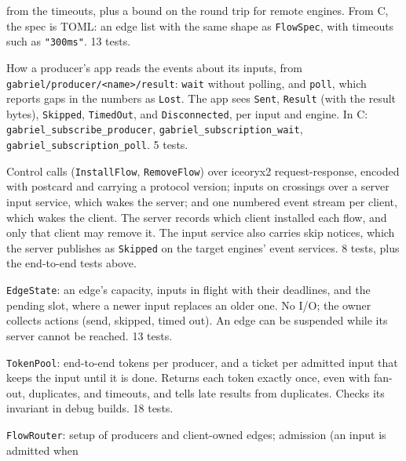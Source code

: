 \documentclass[11pt]{article}
\newcommand{\code}[1]{\texttt{#1}}
\begin{document}
\begin{description}[style=nextline, leftmargin=1.5em]
        from the timeouts, plus a bound on the round trip for remote engines.
        From C, the spec is TOML: an edge list with the same shape as
        \code{FlowSpec}, with timeouts such as \code{"300ms"}. 13 tests.
  \item[Subscription (\code{subscription.rs}, \code{ffi.rs})] How a
        producer's app reads the events about its inputs, from
        \nolinkurl{gabriel/producer/<name>/result}: \code{wait} without
        polling, and \code{poll}, which reports gaps in the numbers as
        \code{Lost}. The app sees \code{Sent}, \code{Result} (with the result
        bytes), \code{Skipped}, \code{TimedOut}, and \code{Disconnected}, per
        input and engine. In C: \code{gabriel\_subscribe\_producer},
        \code{gabriel\_subscription\_wait}, \code{gabriel\_subscription\_poll}.
        5 tests.
  \item[Local client transport (\code{client/local\_server.rs},
        \code{server/local\_clients.rs}, \code{wire.rs})] Control calls
        (\code{InstallFlow}, \code{RemoveFlow}) over iceoryx2 request-response,
        encoded with postcard and carrying a protocol version; inputs on
        crossings over a server input service, which wakes the server; and one
        numbered event stream per client, which wakes the client. The server
        records which client installed each flow, and only that client may
        remove it. The input service also carries skip notices, which the
        server publishes as \code{Skipped} on the target engines' event
        services. 8 tests, plus the end-to-end tests above.
  \item[Edges (\code{routing/edge.rs})] \code{EdgeState}: an edge's capacity,
        inputs in flight with their deadlines, and the pending slot, where a
        newer input replaces an older one. No I/O; the owner collects actions
        (send, skipped, timed out). An edge can be suspended while its server
        cannot be reached. 13 tests.
  \item[Tokens (\code{routing/tokens.rs})] \code{TokenPool}: end-to-end tokens
        per producer, and a ticket per admitted input that keeps the input
        until it is done. Returns each token exactly once, even with fan-out,
        duplicates, and timeouts, and tells late results from duplicates.
        Checks its invariant in debug builds. 18 tests.
  \item[Flow router (\code{routing/flow.rs})] \code{FlowRouter}: setup of
        producers and client-owned edges; admission (an input is admitted when

\end{description}
\end{document}
